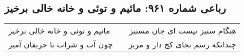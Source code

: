 \begin{center}
\section*{رباعی شماره ۹۶۱: مائیم و توئی و خانه خالی برخیز}
\label{sec:0961}
\begin{longtable}{l p{0.5cm} r}
مائیم و توئی و خانه خالی برخیز
&&
هنگام ستیز نیست ای جان مستیز
\\
چون آب و شراب با حریفان آمیز
&&
چندانکه رسم بجای کج دار و مریز
\\
\end{longtable}
\end{center}
